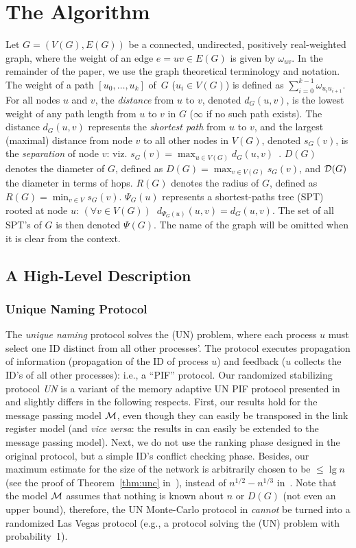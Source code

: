 \documentclass[10pt]{article}
\begin{document}
\section{The Algorithm}\label{algo}
Let $G=(V(G),E(G))$ be a connected, undirected, positively
real-weighted graph, where the weight of an edge $e = uv \in E(G)$ is
given by $\omega_{uv}$. In the remainder of the paper, we use the
graph theoretical terminology and notation. The weight of a path
$[u_{0}, \ldots , u_{k}]$ of~$G$ ($u_{i} \in V(G)$) is defined as
$\sum_{i=0}^{k-1}\omega_{u_{i}u_{i+1}}$. For all nodes $u$ and $v$,
the {\em distance} from $u$ to $v$, denoted $d_G (u,v)$, is the lowest
weight of any path length from $u$ to $v$ in $G$ ($\infty$ if no such
path exists).  The distance $d_G (u,v)$ represents the {\em shortest
path} from $u$ to $v$, and the largest (maximal) distance from node
$v$ to all other nodes in $V(G)$, denoted $s_G (v)$, is the {\em
separation} of node $v$: viz. $s_G (v) =\max_{u\in V(G)} d_G
(u,v)$~\cite{Chri75}.  $D(G)$ denotes the diameter of $G$, defined as
$D(G) = \max_{v\in V(G)} s_G(v)$, and ${\cal D}(G)$ the diameter in
terms of hops. $R(G)$ denotes the radius of $G$, defined as
$R(G)=\min_{v\in V} s_G (v)$. $\Psi_G(u)$ represents a shortest-paths
tree (SPT) rooted at node $u$: $(\forall v\in V(G))\;\;
d_{\Psi_G(u)}(u,v) = d_G(u,v)$.  The set of all SPT's of $G$ is then
denoted $\Psi(G)$. The name of the graph will be omitted when it is clear from the context.

\subsection{A High-Level Description}

\subsubsection{Unique Naming Protocol} \label{un}
The {\em unique naming} protocol solves the (UN) problem, where each
process $u$ must select one ID distinct from all other processes'.
The protocol executes propagation of information (propagation of the
ID of process $u$) and feedback ($u$ collects the ID's of all other
processes): i.e., a ``PIF'' protocol.  Our randomized stabilizing
protocol {\em UN} is a variant of the memory adaptive UN PIF protocol
presented in \cite{AnEH92} and slightly differs in the following
respects.  First, our results hold for the message passing model $\cal
M$, even though they can easily be transposed in the link register
model (and {\em vice versa}: the results in \cite{AnEH92} can easily
be extended to the message passing model).  Next, we do not use the
ranking phase designed in the original protocol, but a simple ID's
conflict checking phase. Besides, our maximum estimate for the size of
the network is arbitrarily chosen to be $\leq\lg n$ (see the proof of
Theorem~\ref{thm:unc} in~\cite{BuBL95}), instead of $n^{1/2} -
n^{1/3}$ in~\cite{AnEH92}.  Note that the model $\cal M$ assumes that
nothing is known about $n$ or $D(G)$ (not even an upper bound),
therefore, the UN Monte-Carlo protocol in
\cite{AnEH92} {\em cannot} be turned into a randomized Las Vegas
protocol (e.g., a protocol solving the (UN) problem with probability~1).
\end{document}
